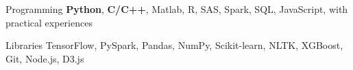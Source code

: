 


\begin{cvskills}


\cvskill
{Programming} %
{\textbf{Python}, \textbf{C/C++}, Matlab, R, SAS, Spark, SQL, JavaScript, with practical experiences} %


\cvskill
{Libraries} %
{TensorFlow, PySpark, Pandas, NumPy, Scikit-learn, NLTK, XGBoost, Git, Node.js, D3.js} %



\end{cvskills}